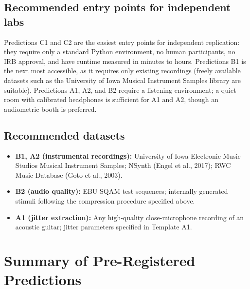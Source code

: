 \documentclass[11pt, a4paper]{article}
\begin{document}
\subsection{Recommended entry points for independent labs}

Predictions C1 and C2 are the easiest entry points for independent replication:
they require only a standard Python environment, no human participants, no IRB
approval, and have runtime measured in minutes to hours.  Predictions B1 is the
next most accessible, as it requires only existing recordings (freely available
datasets such as the University of Iowa Musical Instrument Samples library are
suitable).  Predictions A1, A2, and B2 require a listening environment; a quiet
room with calibrated headphones is sufficient for A1 and A2, though an
audiometric booth is preferred.

\subsection{Recommended datasets}

\begin{itemize}
  \item \textbf{B1, A2 (instrumental recordings):}  University of Iowa Electronic
    Music Studios Musical Instrument Samples; NSynth (Engel et al., 2017);
    RWC Music Database (Goto et al., 2003).
  \item \textbf{B2 (audio quality):}  EBU SQAM test sequences; internally generated
    stimuli following the compression procedure specified above.
  \item \textbf{A1 (jitter extraction):}  Any high-quality close-microphone
    recording of an acoustic guitar; jitter parameters specified in Template A1.
\end{itemize}

\section{Summary of Pre-Registered Predictions}
\end{document}
